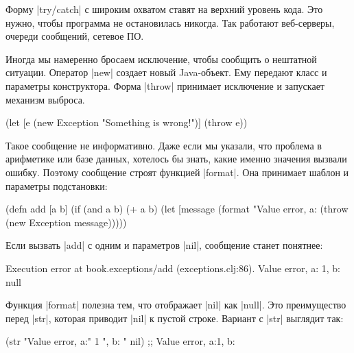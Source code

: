 Форму \spverb|try/catch| с широким охватом ставят на верхний уровень кода. Это
нужно, чтобы программа не остановилась никогда. Так работают веб-серверы,
очереди сообщений, сетевое ПО.

Иногда мы намеренно бросаем исключение, чтобы сообщить о нештатной
ситуации. Оператор \spverb|new| создает новый Java-объект. Ему передают класс и
параметры конструктора. Форма \spverb|throw| принимает исключение и запускает
механизм выброса.

\begin{english}
  \begin{clojure}
(let [e (new Exception "Something is wrong!")]
  (throw e))
  \end{clojure}
\end{english}

Такое сообщение не информативно. Даже если мы указали, что проблема в арифметике
или базе данных, хотелось бы знать, какие именно значения вызвали
ошибку. Поэтому сообщение строят функцией \spverb|format|. Она принимает шаблон
и параметры подстановки:

\begin{english}
  \begin{clojure}
(defn add [a b]
  (if (and a b)
    (+ a b)
    (let [message (format "Value error, a: %
      (throw (new Exception message)))))
  \end{clojure}
\end{english}

\noindent
Если вызвать \spverb|add| с одним и параметров \spverb|nil|, сообщение станет
понятнее:

\begin{english}
  \begin{clojure}
Execution error at book.exceptions/add (exceptions.clj:86).
Value error, a: 1, b: null
  \end{clojure}
\end{english}

Функция \spverb|format| полезна тем, что отображает \spverb|nil| как
\spverb|null|. Это преимущество перед \spverb|str|, которая приводит
\spverb|nil| к пустой строке. Вариант с \spverb|str| выглядит так:

\begin{english}
  \begin{clojure}
(str "Value error, a:" 1 ", b: " nil)
;; Value error, a:1, b:
  \end{clojure}
\end{english}

